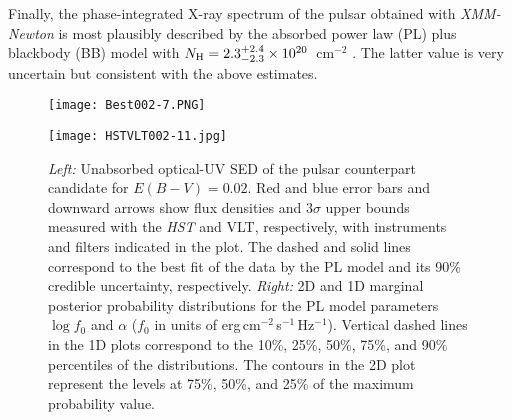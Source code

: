 \documentclass[pdftex,twocolumn]{aastex62}
\newcommand{\gp}[1]{{\color{blue} #1}}
\begin{document}
Finally, the 
phase-integrated X-ray spectrum 
of the pulsar obtained with \textit{XMM-Newton} is 
most plausibly described by the absorbed power 
law (PL) plus blackbody (BB) model with $N_{\rm H} = 2.3^{+2.4}_{-2.3}\times 10^{20}$~cm$^{-2}$ \citep{Posselt2012,Arumugasamy2019}. The latter value is very uncertain but  consistent with the above estimates. 
\begin{figure*}[t!]
\begin{minipage}[h]{0.6\linewidth}
\texttt{[image: Best002-7.PNG]}
\end{minipage}
\hfill
\begin{minipage}[h]{0.4\linewidth}
\texttt{[image: HSTVLT002-11.jpg]}
\end{minipage}
\caption{
{\sl Left:} 
Unabsorbed optical-UV SED  
of the pulsar counterpart candidate for $E(B-V)=0.02$. 
Red  and blue  error bars and downward arrows show  flux densities and $3\sigma$
upper bounds 
measured with the {\sl HST} and VLT, respectively, with instruments and 
filters  indicated in the plot.
The dashed and solid lines correspond to the best fit of the data by the PL model and its 90\% credible  uncertainty, respectively.  
{\sl Right:} 2D and 1D marginal posterior 
probability distributions for the PL model parameters $\log f_0$ and $\alpha$ ($f_0$ in units of erg\,cm$^{-2}$\,s$^{-1}$\,Hz$^{-1}$).  
Vertical dashed lines in the 1D plots correspond 
to the 10\%, 25\%, 50\%, 75\%, and 90\% percentiles of the distributions. The contours in the 2D plot 
represent the  levels at 75\%, 50\%, and 25\% of the maximum probability value.
\label{fig:7}}
\end{figure*}
\end{document}
